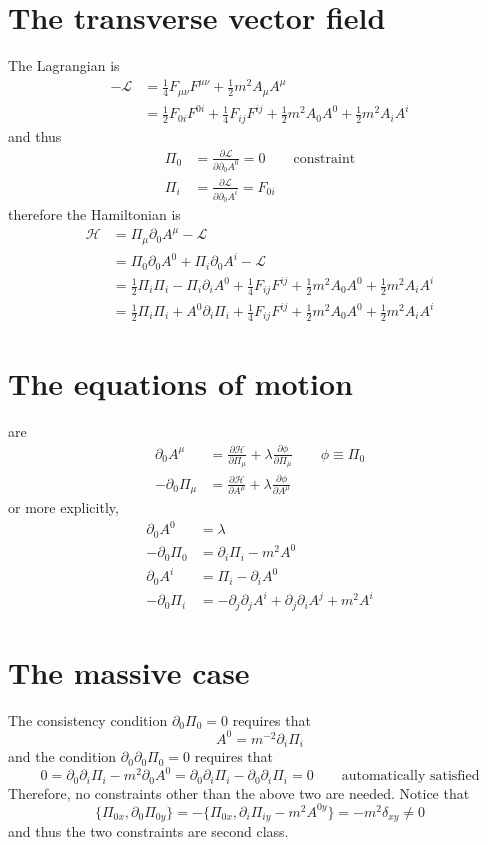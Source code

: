 \documentclass[12pt, oneside]{book}
\begin{document}
\section*{The transverse vector field}
The Lagrangian is
\begin{align*}
-\mathcal{L}
&=\tfrac14F_{\mu\nu}F^{\mu\nu}+\tfrac12m^2A_{\mu}A^{\mu}\\
&=\tfrac12F_{0i}F^{0i}+\tfrac14F_{ij}F^{ij}+\tfrac12m^2A_0A^0+\tfrac12m^2A_iA^i
\end{align*}
and thus
\begin{align*}
\Pi_0&=\frac{\partial\mathcal{L}}{\partial\partial_0A^0}=0\qquad
\text{constraint}\\
\Pi_i&=\frac{\partial\mathcal{L}}{\partial\partial_0A^i}=F_{0i}
\end{align*}
therefore the Hamiltonian is
\begin{align*}
\mathcal{H}
&=\Pi_{\mu}\partial_0A^{\mu}-\mathcal{L}\\
&=\Pi_0\partial_0A^0+\Pi_i\partial_0A^i-\mathcal{L}\\
&=\tfrac12\Pi_i\Pi_i-\Pi_i\partial_iA^0+\tfrac14F_{ij}F^{ij}+\tfrac12m^2A_0A^0+\tfrac12m^2A_iA^i\\
&=\tfrac12\Pi_i\Pi_i+A^0\partial_i\Pi_i+\tfrac14F_{ij}F^{ij}+\tfrac12m^2A_0A^0+\tfrac12m^2A_iA^i
\end{align*}

\section*{The equations of motion}
are
\begin{align*}
\partial_0A^{\mu}&=\frac{\partial\mathcal{H}}{\partial\Pi_{\mu}}+\lambda\frac{\partial\phi}{\partial\Pi_{\mu}}\qquad
\phi\equiv\Pi_0\\
{-}\partial_0\Pi_{\mu}&=\frac{\partial\mathcal{H}}{\partial A^{\mu}}+\lambda\frac{\partial\phi}{\partial A^{\mu}}
\end{align*}
or more explicitly,
\begin{align*}
\partial_0A^0&=\lambda\\
{-}\partial_0\Pi_0&=\partial_i\Pi_i-m^2A^0\\[5pt]
\partial_0A^i&=\Pi_i-\partial_iA^0\\
{-}\partial_0\Pi_i&=-\partial_j\partial_jA^i+\partial_j\partial_iA^j+m^2A^i
\end{align*}

\section*{The massive case}
The consistency condition $\partial_0\Pi_0=0$ requires that
\[
A^0=m^{-2}\partial_i\Pi_i
\]
and the condition $\partial_0\partial_0\Pi_0=0$ requires that
\[
0=\partial_0\partial_i\Pi_i-m^2\partial_0A^0=\partial_0\partial_i\Pi_i-\partial_0\partial_i\Pi_i=0\qquad
\text{automatically satisfied}
\]
Therefore, no constraints other than the above two are needed. Notice that
\[
\big\{\Pi_{0x},\partial_0\Pi_{0y}\big\}=-\big\{\Pi_{0x},\partial_i\Pi_{iy}-m^2A^{0y}\big\}=-m^2\delta_{xy}\ne0
\]
and thus the two constraints are second class.
\end{document}
